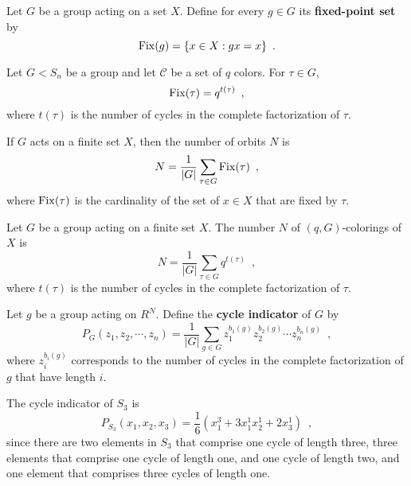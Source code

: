 \begin{definition} \cite[86]{Aigner2007} Let $G$ be a group acting on a set $X$. Define for every $g \in G$ its \textbf{fixed-point set} by 
$$
\operatorname{Fix}(g) = \{ x \in X : gx = x \} \enspace.
$$
\end{definition}

\begin{lemma} \cite[112]{Rotman1967} Let $G < S_n$ be a group and let $\mathcal{C}$ be a set of $q$ colors. For $\tau \in G$,
$$
\operatorname{Fix}(\tau) = q^{t(\tau)} \enspace,
$$
where $t(\tau)$ is the number of cycles in the complete factorization of $\tau$.
\end{lemma}

\begin{lemma}[Burnside] \cite[109]{Rotman1967} If $G$ acts on a finite set $X$, then the number of orbits $N$ is
$$
N = \frac{1}{|G|} \sum_{\tau \in G} \operatorname{Fix}(\tau) \enspace,
$$
where $\operatorname{Fix}(\tau)$ is the cardinality of the set of $x \in X$ that are fixed by $\tau$.
\end{lemma}

\begin{corollary} \cite[112]{Rotman1967} Let $G$ be a group acting on a finite set $X$. The number $N$ of $(q, G)$-colorings of $X$ is
$$
N = \frac{1}{|G|} \sum_{\tau \in G} q^{t(\tau)} \enspace,
$$
where $t(\tau)$ is the number of cycles in the complete factorization of $\tau$.
\end{corollary}

\begin{definition} \cite[87]{Aigner2007} Let $g$ be a group acting on $R^N$. Define the \textbf{cycle indicator} of $G$ by
$$
P_G(z_1, z_2, \cdots, z_n) = \frac{1}{|G|} \sum_{g \in G} z_1^{b_1(g)} z_2^{b_2(g)} \cdots z_n^{b_n(g)} \enspace,
$$
where $z_i^{b_i(g)}$ corresponds to the number of cycles in the complete factorization of $g$ that have length $i$.
\end{definition}

\begin{example} The cycle indicator of $S_3$ is
$$
P_{S_3}(x_1, x_2, x_3) = \frac{1}{6}(x_1^3 + 3 x_1^1 x_2^1 + 2 x_3^1) \enspace,
$$
since there are two elements in $S_3$ that comprise one cycle of length three, three elements that comprise one cycle of length one, and one cycle of length two, and one element that comprises three cycles of length one.
\end{example}

